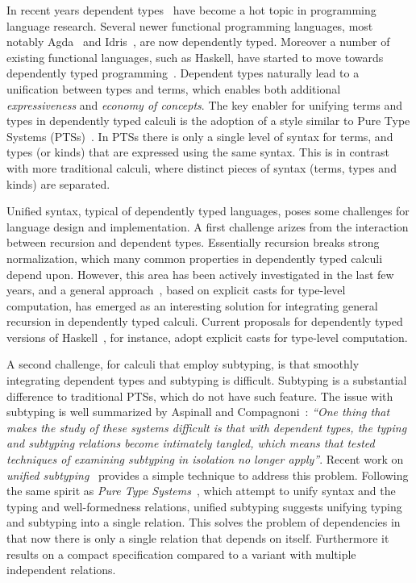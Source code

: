 In recent years dependent
types~\cite{coc,cayenne,dep:pisigma,sjoberg:msfp12,guru,fc:kind,zombie:popl14,zombie:popl15}
have become a hot topic in programming
language research. Several newer
functional programming languages, most notably Agda~\cite{2007_norell_agda} and
Idris~\cite{brady2013idris}, are now dependently typed. Moreover a number of existing functional
languages, such as Haskell, have started to move towards dependently typed programming~\cite{dependenthaskell}. Dependent types naturally lead to a unification between types and terms, which enables both
additional \emph{expressiveness} and \emph{economy of concepts}.
The key enabler for unifying terms and types in dependently typed
calculi is the adoption of a style similar to
Pure Type Systems (PTSs)~\cite{pts}. In PTSs there is only a single level
of syntax for terms, and types (or kinds) that are expressed using the
same syntax. This is in contrast with more traditional calculi, where
distinct pieces of syntax (terms, types and kinds) are separated.

Unified syntax, typical of dependently typed languages,
poses some challenges for language design and implementation.
A first challenge arizes from the interaction between recursion and dependent types.
Essentially recursion breaks strong normalization, which
many common properties in dependently typed calculi depend upon.
However, this area has been actively investigated in the
last few years, and a general approach~\cite{guru,sjoberg:msfp12, kimmel:plpv, zombie:popl15,
  isotype}, based on explicit
casts for type-level computation, has emerged as an interesting
solution for integrating general recursion in dependently typed
calculi. Current proposals for dependently typed versions of Haskell~\cite{dependenthaskell},
for instance, adopt explicit casts for type-level computation.

A second challenge, for calculi that employ subtyping, is that
smoothly integrating
dependent types and subtyping is difficult. Subtyping is a
substantial difference to traditional PTSs, which do not have such feature.
The issue with subtyping
is well summarized by Aspinall and Compagnoni~\cite{subdep}:
\emph{``One thing that makes the study of these systems difficult is that
  with
dependent types, the typing and subtyping relations become intimately
tangled, which means that tested techniques of examining subtyping in
isolation no longer apply''}.
Recent work on \emph{unified subtyping}~\cite{full} provides a
simple technique to address this problem.
Following the same spirit as \emph{Pure Type Systems}~\cite{BarendregtHP:intgts},
which attempt to unify syntax and the typing and well-formedness relations,
unified subtyping suggests unifying typing
and subtyping into a single relation. This solves the problem of dependencies
in that now there is only a single relation that depends on itself. Furthermore
it results on a compact specification compared to a variant with multiple
independent relations.

